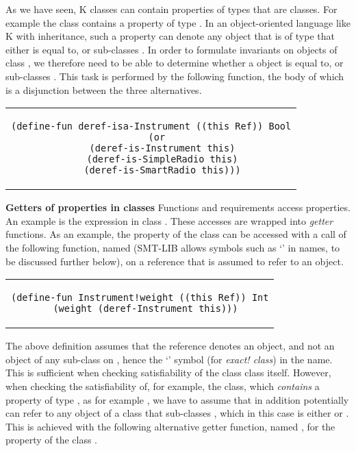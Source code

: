 \noindent As we have seen, K classes can contain properties of types
that are classes. For example the  class contains a
property  of type . In an object-oriented
language like K with inheritance, such a property can denote any
object that is of type that either is equal to, or sub-classes
. In order to formulate invariants on objects of
class , we therefore need to be able to determine
whether a  object is equal to, or sub-classes
. This task is performed by the following function,
the body of which is a disjunction between the three alternatives.

\begin{center}
\begin{tabular}{c}
\begin{lstlisting}
(define-fun deref-isa-Instrument ((this Ref)) Bool
  (or
    (deref-is-Instrument this)
    (deref-is-SimpleRadio this)
    (deref-is-SmartRadio this)))
\end{lstlisting}
\end{tabular}
\end{center}

\textbf{Getters of properties in classes} Functions and requirements
access properties. An example is the expression  in
class .  These accesses are wrapped into {\em getter}
functions. As an example, the  property of the class
 can be accessed with a call of the following
function, named  (SMT-LIB allows symbols such
as `\code{!}'  in names, to be discussed further below), on a
reference that is assumed to refer to an  object.

\begin{center}
\begin{tabular}{c}
\begin{lstlisting}
(define-fun Instrument!weight ((this Ref)) Int
  (weight (deref-Instrument this)))
\end{lstlisting}
\end{tabular}
\end{center}

\noindent The above definition assumes that the  reference
denotes an  object, and not an object of any
sub-class on , hence the `\code{!}' symbol (for {\em
  exact!  class}) in the name.  This is sufficient when checking
satisfiability of the class  class itself. However,
when checking the satisfiability of, for example, the
 class, which {\em contains} a property of type
, as for example , we have
to assume that  in addition potentially can refer to any
object of a class that sub-classes , which in this
case is either  or . This is
achieved with the following alternative getter function, named
, for the  property of the class
.

